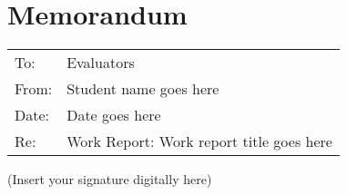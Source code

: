 \section*{Memorandum}

\bigskip

\begin{tabular}{@{}ll}
    To: & Evaluators \\
    
    From: & Student name goes here \\
    
    Date: & Date goes here \\
    
    Re: & Work Report: Work report title goes here
\end{tabular}

\hrulefill

\lipsum[1-3]


(Insert your signature digitally here)
